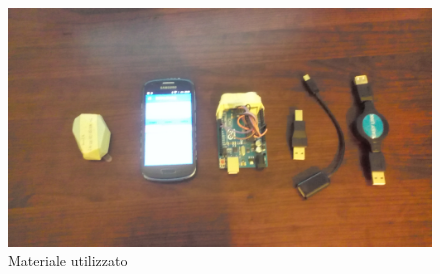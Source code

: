 \begin{figure}[ph]
	\centering
	\includegraphics[width=0.8\linewidth]{img/otg/otg3.jpg}
	\caption{Materiale utilizzato}
\end{figure}